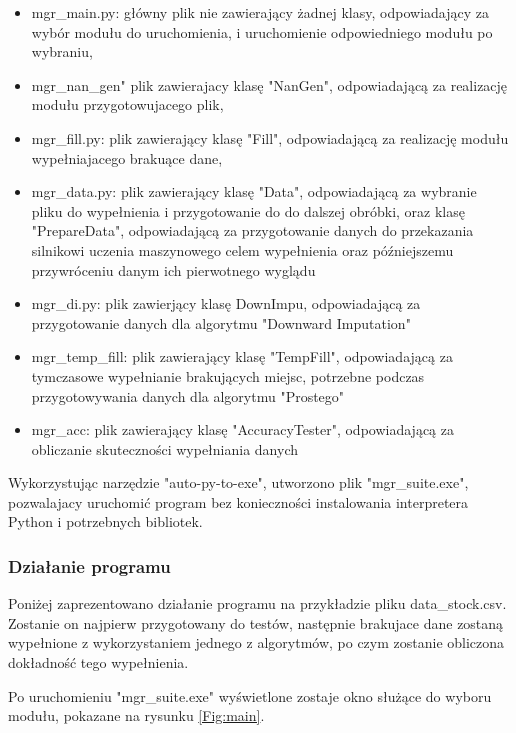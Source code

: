 \documentclass[12pt,twoside]{article}
\begin{document}
\begin{itemize}[label=-,labelsep=0.4cm, leftmargin=1.25cm]
    \item mgr\_main.py: główny plik nie zawierający żadnej klasy, odpowiadający za wybór modułu do uruchomienia,
    i uruchomienie odpowiedniego modułu po wybraniu,
    \item mgr\_nan\_gen" plik zawierajacy klasę "NanGen", odpowiadającą za realizację modułu przygotowujacego plik,
    \item mgr\_fill.py: plik zawierający klasę "Fill", odpowiadającą za realizację modułu wypełniajacego brakuące dane,
    \item mgr\_data.py: plik zawierający klasę "Data",
    odpowiadającą za wybranie pliku do wypełnienia i przygotowanie do do dalszej obróbki, oraz klasę "PrepareData",
    odpowiadającą za przygotowanie danych do przekazania silnikowi uczenia maszynowego celem wypełnienia
    oraz późniejszemu przywróceniu danym ich pierwotnego wyglądu
    \item mgr\_di.py: plik zawierjący klasę DownImpu,
    odpowiadającą za przygotowanie danych dla algorytmu "Downward Imputation"
    \item mgr\_temp\_fill: plik zawierający klasę "TempFill", odpowiadającą za tymczasowe wypełnianie brakujących miejsc,
    potrzebne podczas przygotowywania danych dla algorytmu "Prostego"
    \item mgr\_acc: plik zawierający klasę "AccuracyTester", odpowiadającą za obliczanie skuteczności wypełniania danych
\end{itemize}

Wykorzystując narzędzie "auto-py-to-exe", utworzono plik "mgr\_suite.exe",
pozwalajacy uruchomić program bez konieczności instalowania interpretera Python i potrzebnych bibliotek. \cite{autopy}

\subsubsection{Działanie programu}
Poniżej zaprezentowano działanie programu na przykładzie pliku data\_stock.csv.
Zostanie on najpierw przygotowany do testów,
następnie brakujace dane zostaną wypełnione z wykorzystaniem jednego z algorytmów,
po czym zostanie obliczona dokładność tego wypełnienia.

Po uruchomieniu "mgr\_suite.exe" wyświetlone zostaje okno służące do wyboru modułu, pokazane na rysunku \ref{Fig:main}.
\end{document}
